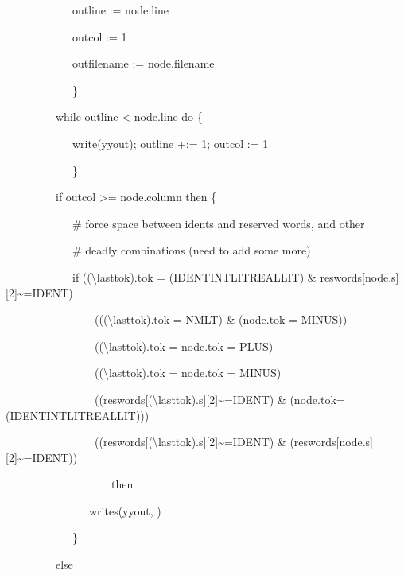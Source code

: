 {\ttfamily\mdseries
\ \ \ \ \ \ \ \ \ \ \ \ outline := node.line}

{\ttfamily\mdseries
\ \ \ \ \ \ \ \ \ \ \ \ outcol := 1}

{\ttfamily\mdseries
\ \ \ \ \ \ \ \ \ \ \ \ outfilename := node.filename}

{\ttfamily\mdseries
\ \ \ \ \ \ \ \ \ \ \ \ \}}

{\ttfamily\mdseries
\ \ \ \ \ \ \ \ \ while outline {\textless} node.line do \{}

{\ttfamily\mdseries
\ \ \ \ \ \ \ \ \ \ \ \ write(yyout); outline +:= 1; outcol := 1}

{\ttfamily\mdseries
\ \ \ \ \ \ \ \ \ \ \ \ \}}

{\ttfamily\mdseries
\ \ \ \ \ \ \ \ \ if outcol {\textgreater}= node.column then \{}

{\ttfamily\mdseries
\ \ \ \ \ \ \ \ \ \ \ \ \# force space between idents and reserved words, and other}

{\ttfamily\mdseries
\ \ \ \ \ \ \ \ \ \ \ \ \# deadly combinations (need to add some more)}

{\ttfamily\mdseries
\ \ \ \ \ \ \ \ \ \ \ \ if (({\textbackslash}lasttok).tok = (IDENT{\textbar}INTLIT{\textbar}REALLIT) \&
reswords[node.s][2]\~{}=IDENT){\textbar}}

{\ttfamily\mdseries
\ \ \ \ \ \ \ \ \ \ \ \ \ \ \ \ ((({\textbackslash}lasttok).tok = NMLT) \& (node.tok = MINUS)) {\textbar}}

{\ttfamily\mdseries
\ \ \ \ \ \ \ \ \ \ \ \ \ \ \ \ (({\textbackslash}lasttok).tok = node.tok = PLUS) {\textbar}}

{\ttfamily\mdseries
\ \ \ \ \ \ \ \ \ \ \ \ \ \ \ \ (({\textbackslash}lasttok).tok = node.tok = MINUS) {\textbar}}

{\ttfamily\mdseries
\ \ \ \ \ \ \ \ \ \ \ \ \ \ \ \ ((reswords[({\textbackslash}lasttok).s][2]\~{}=IDENT) \&
(node.tok=(IDENT{\textbar}INTLIT{\textbar}REALLIT))){\textbar}}

{\ttfamily\mdseries
\ \ \ \ \ \ \ \ \ \ \ \ \ \ \ \ ((reswords[({\textbackslash}lasttok).s][2]\~{}=IDENT) \&
(reswords[node.s][2]\~{}=IDENT))}

{\ttfamily\mdseries
\ \ \ \ \ \ \ \ \ \ \ \ \ \ \ \ \ \ \ then}

{\ttfamily\mdseries
\ \ \ \ \ \ \ \ \ \ \ \ \ \ \ writes(yyout, {\textquotedbl} {\textquotedbl})}

{\ttfamily\mdseries
\ \ \ \ \ \ \ \ \ \ \ \ \}}

{\ttfamily\mdseries
\ \ \ \ \ \ \ \ \ else}

